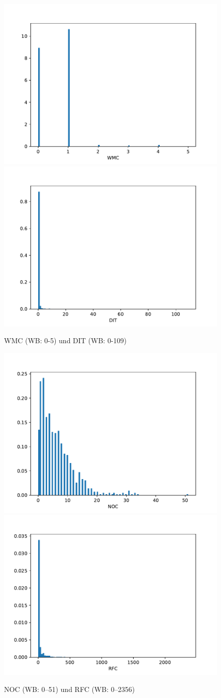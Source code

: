 \documentclass{scrreprt}
\begin{document}
\begin{figure}
 \includegraphics[width=.45\textwidth]{./WMC.pdf}
  \includegraphics[width=.45\textwidth]{./DIT.pdf}
 \caption{WMC (WB: 0-5) und DIT (WB: 0-109)}
 \label{abb:wmc}
\end{figure}


\begin{figure}
 \includegraphics[width=.45\textwidth]{./NOC.pdf}
  \includegraphics[width=.45\textwidth]{./RFC.pdf}
 \caption{NOC (WB: 0–51) und RFC (WB: 0–2356)}
 \label{abb:noc_rfc}
\end{figure}
\end{document}
